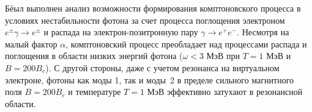Бёыл выполнен анализ возможности формирования комптоновского процесса в условиях нестабильности фотона за счет процесса поглощения электроном $e^\pm\gamma\to e^\pm$ и распада на электрон-позитронную пару $\gamma\to e^+e^-$. Несмотря на малый фактор $\alpha$, комптоновский процесс преобладает над процессами распада и поглощения в области низких энергий фотона ($\omega<3$ МэВ при $T=1$ МэВ и $B =200B_e$). С другой стороны, даже с учетом резонанса на виртуальном электроне, фотоны как моды 1, так и моды~2 в пределе сильного магнитного поля $B=200 B_e$ и температуре $T=1$ МэВ эффективно затухают в резонансной области.

